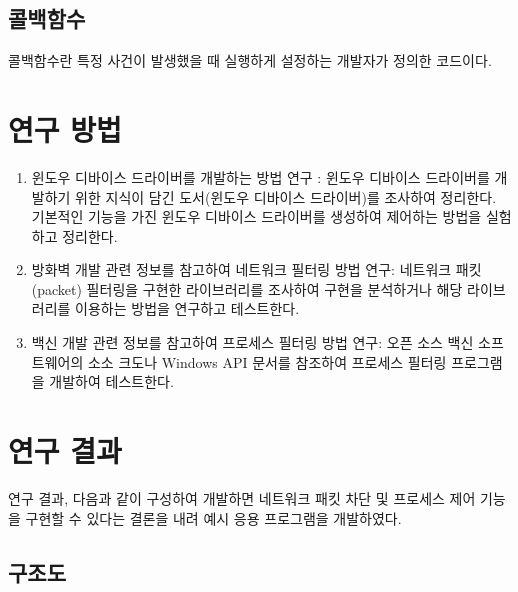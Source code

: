 \documentclass{tudelftposter}
\begin{document}
\subsection{콜백함수}
콜백함수란 특정 사건이 발생했을 때 실행하게 설정하는 개발자가 정의한 코드이다.

\section{연구 방법}
\begin{enumerate}
  \item 윈도우 디바이스 드라이버를 개발하는 방법 연구 : 윈도우 디바이스 드라이버를 개발하기 위한 지식이 담긴 도서(윈도우 디바이스 드라이버)를 조사하여 정리한다. 기본적인 기능을 가진 윈도우 디바이스 드라이버를 생성하여 제어하는 방법을 실험하고 정리한다.
  \item 방화벽 개발 관련 정보를 참고하여 네트워크 필터링 방법 연구: 네트워크 패킷(packet) 필터링을 구현한 라이브러리를 조사하여 구현을 분석하거나 해당 라이브러리를 이용하는 방법을 연구하고 테스트한다.
  \item 백신 개발 관련 정보를 참고하여 프로세스 필터링 방법 연구: 오픈 소스 백신 소프트웨어의 소소 크도나 Windows API 문서를 참조하여 프로세스 필터링 프로그램을 개발하여 테스트한다.
\end{enumerate}

\section{연구 결과}
연구 결과, 다음과 같이 구성하여 개발하면 네트워크 패킷 차단 및 프로세스 제어 기능을 구현할 수 있다는 결론을 내려 예시 응용 프로그램을 개발하였다.
\subsection{구조도}
\end{document}
